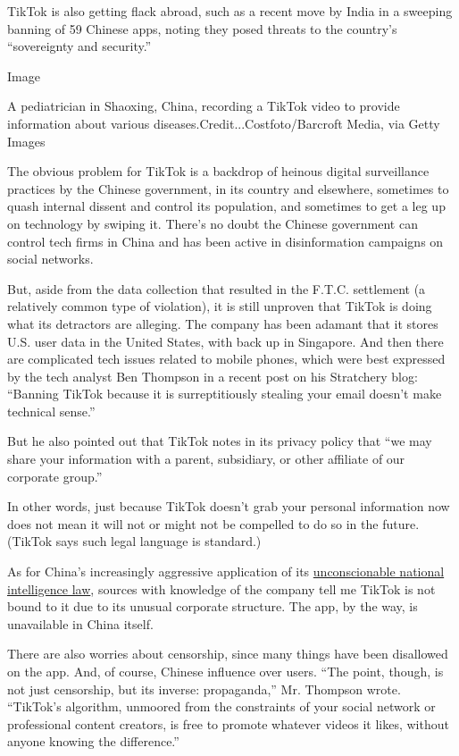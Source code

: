 TikTok is also getting flack abroad, such as a recent move by India in a
sweeping banning of 59 Chinese apps, noting they posed threats to the
country's ``sovereignty and security.''

Image

A pediatrician in Shaoxing, China, recording a TikTok video to provide
information about various diseases.Credit...Costfoto/Barcroft Media, via
Getty Images

The obvious problem for TikTok is a backdrop of heinous digital
surveillance practices by the Chinese government, in its country and
elsewhere, sometimes to quash internal dissent and control its
population, and sometimes to get a leg up on technology by swiping it.
There's no doubt the Chinese government can control tech firms in China
and has been active in disinformation campaigns on social networks.

But, aside from the data collection that resulted in the F.T.C.
settlement (a relatively common type of violation), it is still unproven
that TikTok is doing what its detractors are alleging. The company has
been adamant that it stores U.S. user data in the United States, with
back up in Singapore. And then there are complicated tech issues related
to mobile phones, which were best expressed by the tech analyst Ben
Thompson in a recent post on his Stratchery blog: ``Banning TikTok
because it is surreptitiously stealing your email doesn't make technical
sense.''

But he also pointed out that TikTok notes in its privacy policy that
``we may share your information with a parent, subsidiary, or other
affiliate of our corporate group.''

In other words, just because TikTok doesn't grab your personal
information now does not mean it will not or might not be compelled to
do so in the future. (TikTok says such legal language is standard.)

As for China's increasingly aggressive application of its
\href{https://www.nytimes3xbfgragh.onion/2020/06/28/world/asia/china-hong-kong-national-security-law.html?searchResultPosition=1}{unconscionable
national intelligence law}, sources with knowledge of the company tell
me TikTok is not bound to it due to its unusual corporate structure. The
app, by the way, is unavailable in China itself.

There are also worries about censorship, since many things have been
disallowed on the app. And, of course, Chinese influence over users.
``The point, though, is not just censorship, but its inverse:
propaganda,'' Mr. Thompson wrote. ``TikTok's algorithm, unmoored from
the constraints of your social network or professional content creators,
is free to promote whatever videos it likes, without anyone knowing the
difference.''

